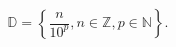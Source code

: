 \documentclass[preview]{standalone}
\begin{document}
\begin{align*}
\mathbb{D} =  \left \{ \dfrac{n}{10^p},n\in\mathbb{Z},p\in\mathbb{N} \right \}.
\end{align*}
\end{document}
